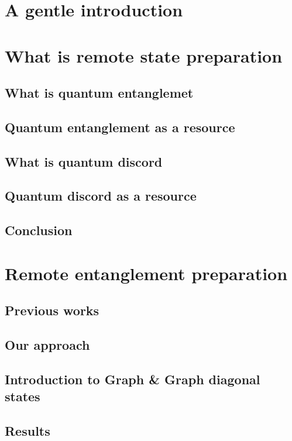 \documentclass[11pt]{article}
\begin{document}
\tableofcontents

\section{A gentle introduction}

\section{What is remote state preparation}
	\subsection{What is quantum entanglemet}
	\subsection{Quantum entanglement as a resource}
	\subsection{What is quantum discord}
	\subsection{Quantum discord as a resource}
	\subsection{Conclusion}

\section{Remote entanglement preparation}
	\subsection{Previous works}
	\subsection{Our approach}
	\subsection{Introduction to Graph \& Graph diagonal states}
	\subsection{Results}
\end{document}
